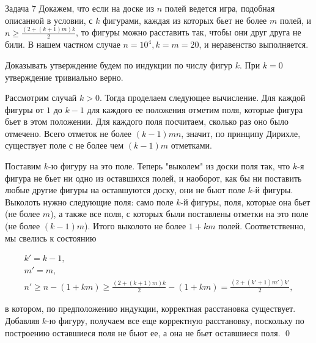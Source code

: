 \documentclass{article}
\begin{document}
	\begin{section}{Задача 7}
		Докажем, что если на доске из $n$ полей ведется игра, подобная описанной в условии, с $k$ фигурами, каждая из которых бьет не более $m$ полей, и $n \ge \frac{(2+(k+1)m)k}{2}$, то фигуры можно расставить так, чтобы они друг друга не били. В нашем частном случае $n = 10^4, k = m = 20$, и неравенство выполняется.

		Доказывать утверждение будем по индукции по числу фигур $k$. При $k = 0$ утверждение тривиально верно.

		Рассмотрим случай $k > 0$. Тогда проделаем следующее вычисление. Для каждой фигуры от $1$ до $k-1$ для каждого ее положения отметим поля, которые фигура бьет в этом положении. Для каждого поля посчитаем, сколько раз оно было отмечено. Всего отметок не более $(k-1)mn$, значит, по принципу Дирихле, существует поле с не более чем $(k-1)m$ отметками.

		Поставим $k$-ю фигуру на это поле. Теперь "выколем" из доски поля так, что $k$-я фигура не бьет ни одно из оставшихся полей, и наоборот, как бы ни поставить любые другие фигуры на оставшуются доску, они не бьют поле $k$-й фигуры. Выколоть нужно следующие поля: само поле $k$-й фигуры, поля, которые она бьет (не более $m$), а также все поля, с которых были поставлены отметки на это поле (не более $(k-1)m$). Итого выколото не более $1+km$ полей. Соответственно, мы свелись к состоянию

		\begin{gather*}
			k' = k - 1, \\
			m' = m, \\
			n' \ge n - (1+km) \ge \frac{(2+(k+1)m)k}{2} - (1+km) = \frac{(2+(k'+1)m')k'}{2},
		\end{gather*}

		в котором, по предположению индукции, корректная расстановка существует. Добавляя $k$-ю фигуру, получаем все еще корректную расстановку, поскольку по построению оставшиеся поля не бьют ее, а она не бьет оставшиеся поля. \qed
	\end{section}
\end{document}
